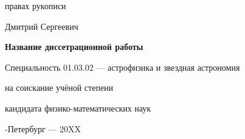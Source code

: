 \fontsize{14pt}{15pt}\selectfont  %
\thispagestyle{empty}

\vspace{10mm}
\begin{flushright}
   правах рукописи
  \textit{}
\end{flushright}

\vspace{30mm}
\begin{center}
{\Large{} Дмитрий Сергеевич}
\end{center}

\vspace{30mm}
\begin{center}
{\bf \LARGE Название диссетрационной работы
\par}

\vspace{30mm}
{\Large
Специальность 01.03.02 --- астрофизика и звездная астрономия
}

\vspace{15mm}
\par
{} на соискание учёной степени\par
кандидата физико-математических наук
\end{center}

\vspace{40mm}
\begin{center}
{-Петербург --- 20XX}
\end{center}

\newpage

